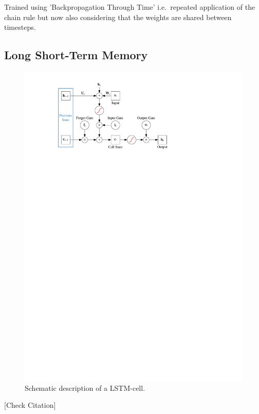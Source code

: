 Trained using 'Backpropagation Through Time' i.e.\ repeated application of the
chain rule but now also considering that the weights are shared between
timesteps.

\subsection{Long Short-Term Memory}
\label{sec:lstm}

\begin{figure}[t]
  \centering
  \includegraphics{./figures/theory/LSTM.pdf}
  \caption{Schematic description of a LSTM-cell.}
  \label{fig:schematic_lstm}
\end{figure}

[Check Citation]\cite{lstm}


